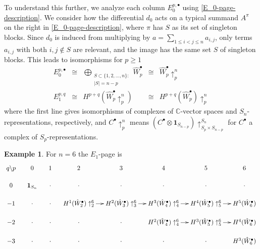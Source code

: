 \documentclass[12pt]{amsart}
\theoremstyle{plain}
\theoremstyle{definition}
\newtheorem{ex}[thm]{Example}
\begin{document}
To understand this further, 
we analyze each column $E_0^{p,\bullet}$ 
using \eqref{E_0-page-description}.
We consider how the differential $d_0$ acts on a typical 
summand $A^\pi$ on the right in
\eqref{E_0-page-description}, where $\pi$ has $S$ as its set 
of singleton blocks. Since $d_0$ is induced from multiplying by
$a=\sum_{1 \leq i < j \leq n} a_{{i,j}}$, only terms $a_{{i,j}}$ with 
both $i,j \not\in S$ are relevant, and the image has the same set $S$ of singleton 
blocks.  This leads to isomorphisms for $p \geq 1$
\begin{equation*}
\begin{array}{rcccl}
E_0^{p,\bullet} 
&\cong  &
\bigoplus_{\substack{S \subset \{1,2,\ldots,n\}:\\ |S|=n-p}} \hat{W}_p^\bullet
&\cong  &
 \hat{W}_p^\bullet  \uparrow_{p}^{n}  
\\
E_1^{p,q} 
&\cong & H^{p+q}(\hat{W}^\bullet_p \uparrow_p^n ) 
&\cong &  
H^{p+q}(\hat{W}^\bullet_p) \uparrow_{p}^{n}  
\end{array}
\end{equation*}
where the first line gives isomorphisms 
of complexes of ${{\mathbb C}}$-vector spaces and $S_n$-representations, respectively,
and $C^\bullet \uparrow_{p}^{n}$ means 
$\left(C^\bullet \otimes {{\mathbf{1}}}_{S_{n-p}} \right)\uparrow_{S_p \times S_{n-p}}^{S_n} $ 
for $C^\bullet$ a complex of $S_p$-representations.  

\begin{ex} \label{E1-page-example}
For $n=6$ the $E_1$-page is
\begin{equation*}
\xymatrix@R=1pc@C=1pc{
q\backslash p &0            &1          &2          &3           &4          &5          &6 \\
0   &{{\mathbf{1}}}_{S_n}            &\cdot          &\cdot          &\cdot           &\cdot          &\cdot          &\cdot\\
-1  &\cdot                      &\cdot           &H^1(\hat{W}_2^\bullet)\uparrow_{2}^{6} \ar[r]   &H^2(\hat{W}_3^\bullet)\uparrow_{3}^{6} \ar[r]   & H^3(\hat{W}_4^\bullet)\uparrow_{4}^{6} \ar[r]     & H^4(\hat{W}_5^\bullet)\uparrow_{5}^{6} \ar[r]      &H^5(\hat{W}_6^\bullet) \\
-2  &\cdot                      &\cdot           &\cdot           &\cdot           &H^2(\hat{W}_4^\bullet)\uparrow_{4}^{6} \ar[r]&H^3(\hat{W}_5^\bullet)\uparrow_{5}^{6} \ar[r]&H^4(\hat{W}_6^\bullet) \\
-3  &\cdot                      &\cdot           &\cdot           &\cdot           &\cdot           &\cdot       &H^3(\hat{W}_6^\bullet) \\
}
\end{equation*}
\end{ex}
\end{document}
